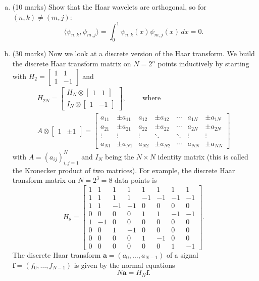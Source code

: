 \documentclass[12pt]{article}
\newcommand{\inp}[2]{\langle #1, #2 \rangle}
\begin{document}
\begin{enumerate}[a.]
\item (10 marks) Show that the Haar wavelets are orthogonal, so for $(n,k) \neq (m,j)$:
\[
\inp{\psi_{n,k}}{\psi_{m,j}} = \int_0^1 \psi_{n,k}(x) \psi_{m,j}(x) \, dx = 0.
\]

\item (30 marks) Now we look at a discrete version of the Haar transform. We build the discrete Haar transform matrix on $N = 2^n$ points inductively by starting with $H_2 = \begin{bmatrix} 1 & 1 \\ 1 & -1 \end{bmatrix}$ and
\begin{gather*}
H_{2N} = \begin{bmatrix}
H_N \otimes \begin{bmatrix} 1 & 1 \end{bmatrix} \\
I_N \otimes \begin{bmatrix} 1 & -1 \end{bmatrix}
\end{bmatrix},
\qquad \text{ where }
\\
A \otimes \begin{bmatrix} 1 & \pm 1 \end{bmatrix} = \begin{bmatrix}
a_{11} & \pm a_{11} & a_{12} & \pm a_{12} & \cdots & a_{1N} & \pm a_{1N} \\
a_{21} & \pm a_{21} & a_{22} & \pm a_{22} & \cdots & a_{2N} & \pm a_{2N} \\
\vdots & \vdots & \vdots & \ddots & \ddots & \vdots & \vdots \\
a_{N1} & \pm a_{N1} & a_{N2} & \pm a_{N2} & \cdots & a_{NN} & \pm a_{NN}
\end{bmatrix}
\end{gather*}
with $A = (a_{ij})_{i,j=1}^N$ and $I_N$ being the $N \times N$ identity matrix (this is called the Kronecker product of two matrices). For example, the discrete Haar transform matrix on $N = 2^3 = 8$ data points is
\[
H_8 = 
\begin{bmatrix}
1&1&1&1&1&1&1&1 \\
1&1&1&1&-1&-1&-1&-1 \\
1&1&-1&-1&0&0&0&0 \\
0&0&0&0&1&1&-1&-1 \\
1&-1&0&0&0&0&0&0 \\
0&0&1&-1&0&0&0&0 \\
0&0&0&0&1&-1&0&0 \\
0&0&0&0&0&0&1&-1
\end{bmatrix}.
\]
The discrete Haar transform $\mathbf{a} = (a_0, \dotsc, a_{N-1})$ of a signal $\mathbf{f} = (f_0, \ldots, f_{N-1})$ is given by the normal equations
\[
N \mathbf{a} = H_N \mathbf{f}.
\]


\end{enumerate}
\end{document}
